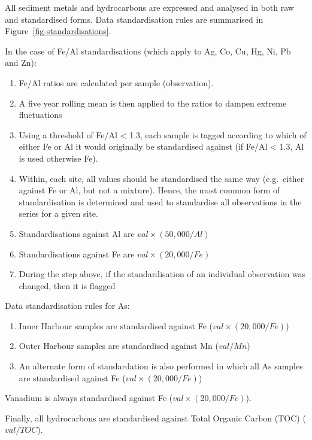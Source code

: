 \documentclass[
  8pt,
  a4paper]{article}
\providecommand{\tightlist}{%
  \setlength{\itemsep}{0pt}\setlength{\parskip}{0pt}}
\begin{document}
All sediment metals and hydrocarbons are expressed and analysed in both
raw and standardised forms. Data standardisation rules are summarised in
Figure~\ref{fig-standardisations}.

In the case of Fe/Al standardisations (which apply to Ag, Co, Cu, Hg,
Ni, Pb and Zn):

\begin{enumerate}
\def\labelenumi{\arabic{enumi}.}
\tightlist
\item
  Fe/Al ratios are calculated per sample (observation).
\item
  A five year rolling mean is then applied to the ratios to dampen
  extreme fluctuations
\item
  Using a threshold of Fe/Al \textless{} 1.3, each sample is tagged
  according to which of either Fe or Al it would originally be
  standardised against (if Fe/Al \textless{} 1.3, Al is used otherwise
  Fe).
\item
  Within, each site, all values should be standardised the same way
  (e.g.~either against Fe or Al, but not a mixture). Hence, the most
  common form of standardisation is determined and used to standardise
  all observations in the series for a given site.
\item
  Standardisations against Al are \(val\times(50,000/Al)\)
\item
  Standardisations against Fe are \(val\times(20,000/Fe)\)
\item
  During the step above, if the standardisation of an individual
  observation was changed, then it is flagged
\end{enumerate}

Data standardisation rules for As:

\begin{enumerate}
\def\labelenumi{\arabic{enumi}.}
\tightlist
\item
  Inner Harbour samples are standardised against Fe
  (\(val\times(20,000/Fe)\))
\item
  Outer Harbour samples are standardised against Mn (\(val/Mn\))
\item
  An alternate form of standardation is also performed in which all As
  samples are standardised against Fe (\(val\times(20,000/Fe)\))
\end{enumerate}

Vanadium is always standardised against Fe (\(val\times(20,000/Fe)\)).

Finally, all hydrocarbons are standardised against Total Organic Carbon
(TOC) (\(val/TOC\)).
\end{document}
